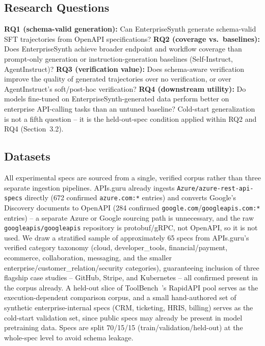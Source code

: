 \documentclass[11pt]{article}
\begin{document}
\subsection{Research Questions}
\textbf{RQ1 (schema-valid generation):} Can EnterpriseSynth generate schema-valid SFT trajectories
from OpenAPI specifications? \textbf{RQ2 (coverage vs.\ baselines):} Does EnterpriseSynth achieve
broader endpoint and workflow coverage than prompt-only generation or instruction-generation
baselines (Self-Instruct, AgentInstruct)? \textbf{RQ3 (verification value):} Does schema-aware
verification improve the quality of generated trajectories over no verification, or over
AgentInstruct's soft/post-hoc verification? \textbf{RQ4 (downstream utility):} Do models fine-tuned
on EnterpriseSynth-generated data perform better on enterprise API-calling tasks than an untuned
baseline? Cold-start generalization is not a fifth question -- it is the held-out-spec condition
applied within RQ2 and RQ4 (Section~3.2).

\subsection{Datasets}
All experimental specs are sourced from a single, verified corpus rather than three separate
ingestion pipelines. APIs.guru already ingests \texttt{Azure/azure-rest-api-specs} directly
(672 confirmed \texttt{azure.com:*} entries) and converts Google's Discovery documents to OpenAPI
(284 confirmed \texttt{google.com}/\texttt{googleapis.com:*} entries) -- a separate Azure or Google
sourcing path is unnecessary, and the raw \texttt{googleapis/googleapis} repository is
protobuf/gRPC, not OpenAPI, so it is not used. We draw a stratified sample of approximately 65
specs from APIs.guru's verified category taxonomy (cloud, developer\_tools, financial/payment,
ecommerce, collaboration, messaging, and the smaller enterprise/customer\_relation/security
categories), guaranteeing inclusion of three flagship case studies -- GitHub, Stripe, and
Kubernetes -- all confirmed present in the corpus already. A held-out slice of
ToolBench~\cite{qin2023toolbench}'s RapidAPI pool serves as the execution-dependent comparison
corpus, and a small hand-authored set of synthetic enterprise-internal specs (CRM, ticketing, HRIS,
billing) serves as the cold-start validation set, since public specs may already be present in
model pretraining data. Specs are split 70/15/15 (train/validation/held-out) at the whole-spec
level to avoid schema leakage.
\end{document}
